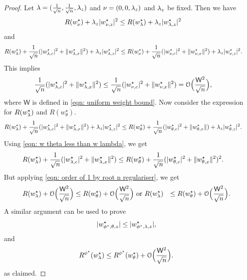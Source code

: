 \begin{proof}
    Let $\lambda = (\frac{1}{\sqrt{n}},\frac{1}{\sqrt{n}},\lambda_z)$ and $\nu = (0,0,\lambda_z)$ and $\lambda_z$ be fixed. Then we have
    \begin{equation*}
    \begin{aligned}
    R(w^\star_\nu) + \lambda_z|w^\star_{\nu,z}|^2 &\leq R(w^\star_{\lambda}) + \lambda_z|w^\star_{{\lambda,z}}|^2
    \end{aligned}
    \end{equation*}
and
    \begin{equation*}
\begin{aligned}
    &R(w^\star_{\lambda}) + \frac{1}{\sqrt{n}}(|w^\star_{{\lambda,c}}|^2 + \|w^\star_{{\lambda,x}}\|^2) + \lambda_z|w^\star_{{\lambda,z}}|^2 \leq R(w^\star_\nu) + \frac{1}{\sqrt{n}}(|w^\star_{\nu,c}|^2 + \|w^\star_{\nu,x}\|^2) + \lambda_z|w^\star_{\nu,z}|^2.
    \end{aligned}
    \end{equation*}
    This implies
    \begin{equation}\label{eqn: order of 1 by root n regulariser}
    \begin{aligned}
        \frac{1}{\sqrt{n}}(|w^\star_{{\lambda,c}}|^2 + \|w^\star_{{\lambda,x}}\|^2) &\leq \frac{1}{\sqrt{n}}(|w^\star_{\nu,c}|^2 + \|w^\star_{\nu,x}\|^2) = \mathcal{O}\Big(\frac{\mathsf{W}^2}{\sqrt{n}}\Big),
        \end{aligned}
    \end{equation}
where $\mathsf{W}$ is defined in \eqref{eqn: uniform weight bound}.
Now consider the expression for $R(w^\star_{\lambda})$ and $R(w_{\theta}^\star)$.
\begin{equation*}
\begin{aligned}
    &R(w^\star_{\lambda}) + \frac{1}{\sqrt{n}}(|w^\star_{{\lambda,c}}|^2 + \|w^\star_{{\lambda,x}}\|^2) + \lambda_z|w^\star_{{\lambda,z}}|^2 \leq R(w^\star_\theta) + \frac{1}{\sqrt{n}}(|w^\star_{\theta,c}|^2 + \|w^\star_{\theta,x}\|) + \lambda_z|w^\star_{\theta,z}|^2.
    \end{aligned}
\end{equation*}
Using \eqref{eqn: w theta less than w lambda}, we get
\begin{equation*}
\begin{aligned}
    &R(w^\star_{\lambda}) + \frac{1}{\sqrt{n}}(|w^\star_{{\lambda,c}}|^2 + \|w^\star_{{\lambda,x}}\|^2) \leq R(w^\star_\theta) + \frac{1}{\sqrt{n}}(|w^\star_{\theta,c}|^2 + \|w^\star_{\theta,x}\|^2)^2.
    \end{aligned}
\end{equation*}
But applying \eqref{eqn: order of 1 by root n regulariser}, we get
\begin{equation}
\begin{aligned}
    R(w^\star_{\lambda}) + \mathcal{O}\Big(\frac{\mathsf{W}^2}{\sqrt{n}}\Big) &\leq R(w^\star_\theta) + \mathcal{O}\Big(\frac{\mathsf{W}^2}{\sqrt{n}}\Big) \text{ or } R(w^\star_{\lambda}) &\leq R(w^\star_\theta) + \mathcal{O}\Big(\frac{\mathsf{W}^2}{\sqrt{n}}\Big).
    \end{aligned}
\end{equation}
    A similar argument can be used to prove
     \begin{equation}
        |w^\star_{\phi^\star,\theta,z}| \leq |w^\star_{\phi^\star,\lambda,z}|,
    \end{equation}
    and
    \begin{equation*}
        R^{\phi^\star}(w^\star_{\lambda}) \leq R^{\phi^\star}(w^\star_{\theta}) + \mathcal{O}\Big(\frac{\mathsf{W}^2}{\sqrt{n}}\Big).
    \end{equation*}
    as claimed.
\end{proof}

